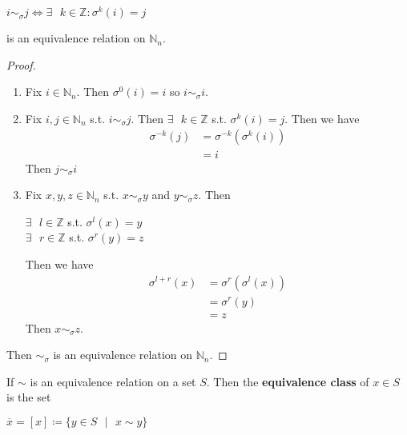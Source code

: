 \documentclass{article}
\newenvironment{definition}[2][Definition]{\begin{trivlist}
\item[\hskip \labelsep {\emph{#1}}\hskip \labelsep {#2.}]}{\end{trivlist}}
\begin{document}
\begin{itemize}
    \begin{center}
        $i\sim_\sigma j \iff \exists\text{ }k\in\mathbb{Z}\colon\sigma^k(i)=j$
    \end{center}
    is an equivalence relation on $\mathbb{N}_n$.
    \begin{proof}\text{ }
      \\\begin{enumerate}
      \item Fix $i\in\mathbb{N}_n$. Then $\sigma^0(i) = i$ so $i \sim_\sigma i$.
      \item Fix $i,j\in\mathbb{N}_n$ s.t. $i\sim_\sigma j$. Then $\exists\text{ }k\in\mathbb{Z}$ s.t. $\sigma^k(i) = j$. Then we have
        \begin{align*}
          \sigma^{-k}(j) &= \sigma^{-k}(\sigma^k(i)) \\
          &= i
        \end{align*}
        Then $j\sim_\sigma{i}$
      \item Fix $x,y,z \in\mathbb{N}_n$ s.t. $x\sim_\sigma y$ and $y\sim_\sigma z$. Then
        \begin{center}
          $\exists \text{ } l\in\mathbb{Z}$ s.t. $\sigma^l(x) = y$\\
          $\exists \text{ } r\in\mathbb{Z}$ s.t. $\sigma^r(y) = z$
        \end{center}
        Then we have
        \begin{align*}
          \sigma^{l+r}(x) &= \sigma^r(\sigma^l(x))\\
                          &= \sigma^r(y)\\
                          &= z
        \end{align*}
        Then $x\sim_\sigma z$.
      \end{enumerate}
      Then $\sim_\sigma$ is an equivalence relation on $\mathbb{N}_n$. 
    \end{proof}
    \iffalse
    \begin{definition}
      \\If $\sim$ is an equivalence relation on a set $S$. Then the \textbf{equivalence class} of $x\in S$ is the set
      \begin{center}
        $\overline{x} = [x] \coloneq \{y\in S\text{ }\vert\text{ } x\sim y\}$
      \end{center}
    \end{definition}
    

\end{itemize}
\end{document}

